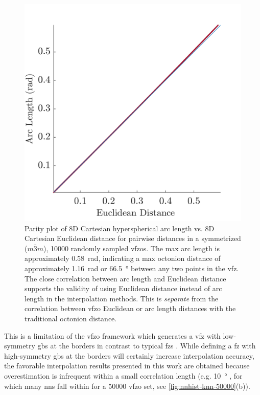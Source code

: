 \documentclass[final,twocolumn,12pt]{elsarticle}
\begin{document}
\begin{figure}
\centering
\includegraphics[scale=1]{dist-parity.png}
\caption{Parity plot of 8D Cartesian hyperspherical arc length vs. 8D Cartesian Euclidean distance for pairwise distances in a symmetrized ($m\bar{3}m$), \num{10000} randomly sampled \glspl{vfzo}. The max arc length is approximately \SI{0.58}{\radian}, indicating a max octonion distance of approximately \SI{1.16}{\radian} or \SI{66.5}{\degree} between any two points in the \gls{vfz}. The close correlation between arc length and Euclidean distance supports the validity of using Euclidean distance instead of arc length in the interpolation methods. This is \textit{separate} from the correlation between \gls{vfzo} Euclidean or arc length distances with the traditional octonion distance.}
\label{fig:dist-parity}
\end{figure}

This is a limitation of the \gls{vfzo} framework which generates a \gls{vfz} with low-symmetry \glspl{gb} at the borders in contrast to typical \glspl{fz} \cite{patalaSymmetriesRepresentationGrain2013,homerGrainBoundaryPlane2015}. While defining a \gls{fz} with high-symmetry \glspl{gb} at the borders will certainly increase interpolation accuracy, the favorable interpolation results presented in this work are obtained because overestimation is infrequent within a small correlation length (e.g. \SI{10}{\degree} \cite{olmstedSurveyComputedGrain2009}, for which many \glspl{nn} fall within for a \num{50000} \gls{vfzo} set, see \cref{fig:nnhist-knn-50000}(b)).
\end{document}
